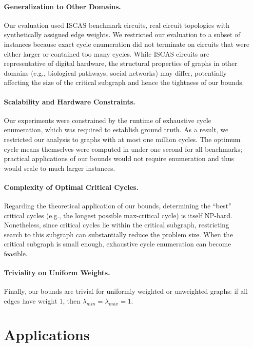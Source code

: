 \documentclass{article}
\theoremstyle{definition}
\begin{document}
\paragraph{Generalization to Other Domains.}
Our evaluation used ISCAS benchmark circuits, real circuit topologies
with synthetically assigned edge weights. We restricted our evaluation
to a subset of instances because exact cycle enumeration did not
terminate on circuits that were either larger or contained too many
cycles. While ISCAS circuits are representative of digital hardware,
the structural properties of graphs in other domains (e.g., biological
pathways, social networks) may differ, potentially affecting the size
of the critical subgraph and hence the tightness of our bounds.

\paragraph{Scalability and Hardware Constraints.}
Our experiments were constrained by the runtime of exhaustive cycle
enumeration, which was required to establish ground truth. As a
result, we restricted our analysis to graphs with at most one million
cycles. The optimum cycle means themselves were computed in under one
second for all benchmarks; practical applications of our bounds would
not require enumeration and thus would scale to much larger instances.

\paragraph{Complexity of Optimal Critical Cycles.}
Regarding the theoretical application of our bounds, determining the
``best'' critical cycles (e.g., the longest possible max-critical
cycle) is itself NP-hard. Nonetheless, since critical cycles lie
within the critical subgraph, restricting search to this subgraph can
substantially reduce the problem size. When the critical subgraph is
small enough, exhaustive cycle enumeration \citep{Jo75,HaJa08,BaSa25}
can become feasible.

\paragraph{Triviality on Uniform Weights.}
Finally, our bounds are trivial for uniformly weighted or unweighted
graphs: if all edges have weight 1, then $\lambda_{min} =
\lambda_{max} = 1$.

\section{Applications}
\label{sec:applications}
\end{document}

